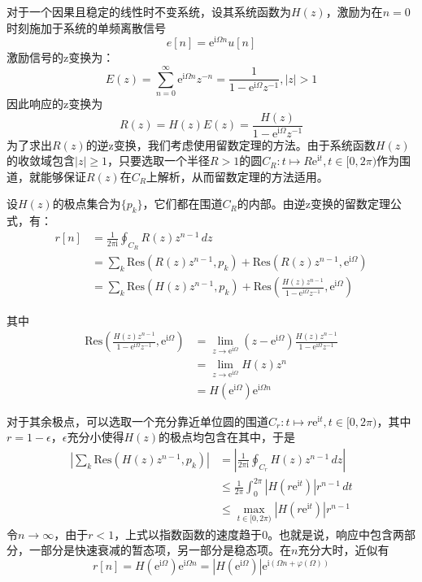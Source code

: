 \begin{example}
    对于一个因果且稳定的线性时不变系统，设其系统函数为$H(z)$，激励为在$n=0$时刻施加于系统的单频离散信号
    $$e[n]=\mathrm{e}^{\mathrm{i}\Omega n}u[n]$$
    激励信号的z变换为：
    $$E(z)=\sum_{n=0}^{\infty}\mathrm{e}^{\mathrm{i}\Omega n}z^{-n}=\frac{1}{1-\mathrm{e}^{\mathrm{i}\Omega}z^{-1}},|z|>1$$
    因此响应的z变换为
    $$R(z)=H(z)E(z)=\frac{H(z)}{1-\mathrm{e}^{\mathrm{i}\Omega}z^{-1}}$$
    为了求出$R(z)$的逆z变换，我们考虑使用留数定理的方法。由于系统函数$H(z)$的收敛域包含$|z|\geq 1$，只要选取一个半径$R>1$的圆$C_R:t\mapsto R\mathrm{e}^{\mathrm{i}t},t\in[0,2\pi)$作为围道，就能够保证$R(z)$在$C_R$上解析，从而留数定理的方法适用。

    设$H(z)$的极点集合为$\{p_k\}$，它们都在围道$C_R$的内部。由逆z变换的留数定理公式，有：\begin{align*}
        r[n]&=\frac{1}{2\pi\mathrm{i}}\oint_{C_R}R(z)z^{n-1}\,dz\\
        &=\sum_{k}\text{Res}(R(z)z^{n-1},p_k)+\text{Res}(R(z)z^{n-1},\mathrm{e}^{\mathrm{i}\Omega})\\
        &=\sum_{k}\text{Res}(H(z)z^{n-1},p_k)+\text{Res}\left(\frac{H(z)z^{n-1}}{1-\mathrm{e}^{\mathrm{i}\Omega}z^{-1}},\mathrm{e}^{\mathrm{i}\Omega}\right)
    \end{align*}

    其中\begin{align*}
        \text{Res}\left(\frac{H(z)z^{n-1}}{1-\mathrm{e}^{\mathrm{i}\Omega}z^{-1}},\mathrm{e}^{\mathrm{i}\Omega}\right)&=\lim_{z\to \mathrm{e}^{\mathrm{i}\Omega}}(z-\mathrm{e}^{\mathrm{i}\Omega})\frac{H(z)z^{n-1}}{1-\mathrm{e}^{\mathrm{i}\Omega}z^{-1}}\\
        &=\lim_{z\to \mathrm{e}^{\mathrm{i}\Omega}}H(z)z^n\\
        &=H(\mathrm{e}^{\mathrm{i}\Omega})\mathrm{e}^{\mathrm{i}\Omega n}
    \end{align*}

    对于其余极点，可以选取一个充分靠近单位圆的围道$C_r:t\mapsto r\mathrm{e}^{\mathrm{i}t},t\in[0,2\pi)$，其中$r=1-\epsilon$，$\epsilon$充分小使得$H(z)$的极点均包含在其中，于是\begin{align*}
        \left|\sum_{k}\text{Res}(H(z)z^{n-1},p_k)\right|&=\left|\frac{1}{2\pi\mathrm{i}}\oint_{C_r}H(z)z^{n-1}\,dz\right|\\
        &\leq \frac{1}{2\pi}\int_{0}^{2\pi}|H(r\mathrm{e}^{\mathrm{i}t})|r^{n-1}\,dt\\
        &\leq \max_{t\in[0,2\pi)}|H(r\mathrm{e}^{\mathrm{i}t})|r^{n-1}
    \end{align*}
    令$n\to\infty$，由于$r<1$，上式以指数函数的速度趋于$0$。也就是说，响应中包含两部分，一部分是快速衰减的暂态项，另一部分是稳态项。在$n$充分大时，近似有
    $$r[n]=H(\mathrm{e}^{\mathrm{i}\Omega})\mathrm{e}^{\mathrm{i}\Omega n}=|H(\mathrm{e}^{\mathrm{i}\Omega})|\mathrm{e}^{\mathrm{i}(\Omega n+\varphi(\Omega))}$$


\end{example}

